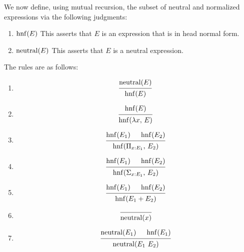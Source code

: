 \documentclass{article}
\begin{document}
\begin{definition} 
We now define, using mutual recursion, the subset of neutral and 
normalized expressions via the following judgments:
\begin{enumerate}
  \item $\operatorname{hnf}(E)$
    This asserts that $E$ is an expression that is in head normal form.
  
  \item $\operatorname{neutral}(E)$
    This asserts that $E$ is a neutral expression.
\end{enumerate}

The rules are as follows:
\begin{enumerate}
  \item \[
    \begin{prooftree}
      \hypo{\neutral(E)}
      \infer1{\hnf(E)}
    \end{prooftree}
  \]

  \item \[
    \begin{prooftree}
      \hypo{\hnf(E)}
      \infer1{\hnf(\lambda x, \, E)}
    \end{prooftree}
  \]

  \item \[
    \begin{prooftree}
      \hypo{\hnf(E_1)}
      \hypo{\hnf(E_2)}
      \infer2{\hnf(\Pi_{x : E_1}, \, E_2)}
    \end{prooftree}
  \]

 \item \[
    \begin{prooftree}
      \hypo{\hnf(E_1)}
      \hypo{\hnf(E_2)}
      \infer2{\hnf(\Sigma_{x : E_1}, \, E_2)}
    \end{prooftree}
  \]

 \item \[
    \begin{prooftree}
      \hypo{\hnf(E_1)}
      \hypo{\hnf(E_2)}
      \infer2{\hnf(E_1 + E_2)}
    \end{prooftree}
  \]

  \item \[
    \begin{prooftree}
      \infer0{\neutral(x)}
    \end{prooftree}
  \]

  \item \[
    \begin{prooftree}
      \hypo{\neutral(E_1)} 
      \hypo{\hnf(E_1)} 
      \infer2{\neutral(E_1 \,\, E_2)}
    \end{prooftree}
  \]


\end{enumerate}
\end{definition}
\end{document}

